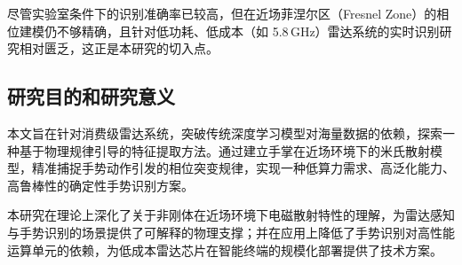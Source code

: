 尽管实验室条件下的识别准确率已较高，但在近场菲涅尔区（Fresnel Zone）的相位建模仍不够精确，且针对低功耗、低成本（如 5.8\,GHz）雷达系统的实时识别研究相对匮乏\cite{zhang2021deterministic}，这正是本研究的切入点。

\subsection{研究目的和研究意义}

本文旨在针对消费级雷达系统，突破传统深度学习模型对海量数据的依赖，探索一种基于物理规律引导的特征提取方法。通过建立手掌在近场环境下的米氏散射模型，精准捕捉手势动作引发的相位突变规律，实现一种低算力需求、高泛化能力、高鲁棒性的确定性手势识别方案。

本研究在理论上深化了关于非刚体在近场环境下电磁散射特性的理解，为雷达感知与手势识别的场景提供了可解释的物理支撑；并在应用上降低了手势识别对高性能运算单元的依赖，为低成本雷达芯片在智能终端的规模化部署提供了技术方案。
